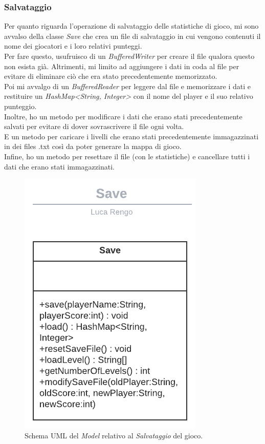 
\subsubsection*{Salvataggio}

\textsf{\small Per quanto riguarda l'operazione di salvataggio delle statistiche di gioco, mi sono avvalso della classe \emph{Save} che crea un file di salvataggio in cui vengono contenuti il nome dei giocatori e i loro relativi punteggi.}\\

\textsf{\small Per fare questo, usufruisco di un \emph{BufferedWriter} per creare il file qualora questo non esista già. Altrimenti, mi limito ad aggiungere i dati in coda al file per evitare di eliminare ciò che era stato precedentemente memorizzato.}\\

\textsf{\small Poi mi avvalgo di un \emph{BufferedReader} per leggere dal file e memorizzare i dati e restituire un \emph{HashMap<String, Integer>} con il nome del player e il suo relativo punteggio.}\\

\textsf{\small Inoltre, ho un metodo per modificare i dati che erano stati precedentemente salvati per evitare di dover sovrascrivere il file ogni volta.}\\

\textsf{\small E un metodo per caricare i livelli che erano stati precedentemente immagazzinati in dei files .txt così da poter generare la mappa di gioco.}\\

\textsf{\small Infine, ho un metodo per resettare il file (con le statistiche) e cancellare tutti i dati che erano stati immagazzinati.}\\

\begin{figure}[H]
	\centering{}
	\includegraphics[width=.5\textwidth]{./img/save_uml.png} 
	\caption{Schema UML del \emph{Model} relativo al \emph{Salvataggio} del gioco.}
	\label{img:save_uml}
\end{figure}